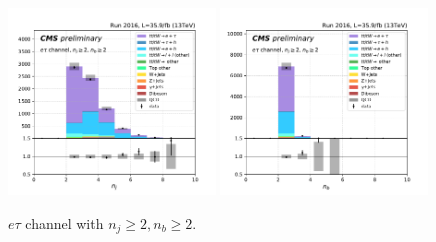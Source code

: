\begin{figure}[ht]
    \includegraphics[width=0.49\textwidth]{chapters/Analysis/sectionPlots/figures/kinematics_pickles/etau/2b/etau_2b_nJets.pdf}
    \includegraphics[width=0.49\textwidth]{chapters/Analysis/sectionPlots/figures/kinematics_pickles/etau/2b/etau_2b_nBJets.pdf}
    
    \caption{$e\tau$ channel with $n_j\geq2, n_b\geq2$.}
\end{figure}


